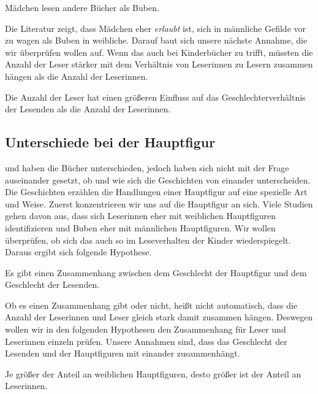 \begin{hyp}\label{hyp:andere}
    Mädchen lesen andere Bücher als Buben.
\end{hyp}

Die Literatur zeigt, dass Mädchen eher \emph{erlaubt} ist, sich in
männliche Gefilde vor zu wagen als Buben in weibliche. Darauf baut sich
unsere nächste Annahme, die wir überprüfen wollen auf. Wenn das auch bei
Kinderbücher zu trifft, müssten die Anzahl der Leser stärker mit dem
Verhältnis von Leserinnen zu Lesern zusammen hängen als die Anzahl der
Leserinnen.

\begin{subhyp}\label{hyp:anzahl}
    Die Anzahl der Leser hat einen größeren Einfluss auf das Geschlechterverhältnis der Lesenden als die Anzahl der Leserinnen.
\end{subhyp}

\subsection{Unterschiede bei der Hauptfigur}

 und  haben die Bücher
unterschieden, jedoch haben sich nicht mit der Frage auseinander
gesetzt, ob und wie sich die Geschichten von einander unterscheiden. Die
Geschichten erzählen die Handlungen einer Hauptfigur auf eine spezielle
Art und Weise. Zuerst konzentrieren wir uns auf die Hauptfigur an sich.
Viele Studien gehen davon aus, dass sich Leserinnen eher mit weiblichen
Hauptfiguren identifizieren und Buben eher mit männlichen Hauptfiguren.
Wir wollen überprüfen, ob sich das auch so im Leseverhalten der Kinder
wiederspiegelt. Daraus ergibt sich folgende Hypothese.

\begin{hyp}\label{h2}
    Es gibt einen Zusammenhang zwischen dem Geschlecht der Hauptfigur
    und dem Geschlecht der Lesenden.
\end{hyp}

Ob es einen Zusammenhang gibt oder nicht, heißt nicht automatisch, dass
die Anzahl der Leserinnen und Leser gleich stark damit zusammen hängen.
Deswegen wollen wir in den folgenden Hypothesen den Zusammenhang für
Leser und Leserinnen einzeln prüfen. Unsere Annahmen sind, dass das
Geschlecht der Lesenden und der Hauptfiguren mit einander zusammenhängt.

\begin{subhyp}\label{h2.1}
       Je größer der Anteil an weiblichen Hauptfiguren,
        desto größer ist der Anteil an Leserinnen.
\end{subhyp}


